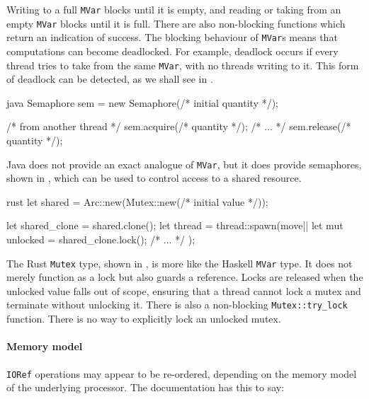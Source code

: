 Writing to a full \verb|MVar| blocks until it is empty, and reading or
taking from an empty \verb|MVar| blocks until it is full.  There are
also non-blocking functions which return an indication of success.
The blocking behaviour of \verb|MVar|s means that computations can
become deadlocked.  For example, deadlock occurs if every thread tries
to take from the same \verb|MVar|, with no threads writing to it.
This form of deadlock can be detected, as we shall see in
.

\begin{listing}
\centering
\begin{cminted}{java}
Semaphore sem = new Semaphore(/* initial quantity */);

/* from another thread */
sem.acquire(/* quantity */);
/* ... */
sem.release(/* quantity */);
\end{cminted}
\caption{Mutual exclusion in Java.}\label{lst:mute_java}
\end{listing}

Java does not provide an exact analogue of \verb|MVar|, but it does
provide semaphores\cite{ewd123}, shown in , which
can be used to control access to a shared resource.

\begin{listing}
\centering
\begin{cminted}{rust}
let shared = Arc::new(Mutex::new(/* initial value */));

let shared_clone = shared.clone();
let thread = thread::spawn(move|| {
    let mut unlocked = shared_clone.lock();
    /* ... */
});
\end{cminted}
\caption{Mutual exclusion in Rust.}\label{lst:mute_rust}
\end{listing}

The Rust \verb|Mutex| type, shown in , is more
like the Haskell \verb|MVar| type.  It does not merely function as a
lock but also guards a reference.  Locks are released when the
unlocked value falls out of scope, ensuring that a thread cannot lock
a mutex and terminate without unlocking it.  There is also a
non-blocking \verb|Mutex::try_lock| function.  There is no way to
explicitly lock an unlocked mutex.

\paragraph{Memory model}
\verb|IORef| operations may appear to be re-ordered, depending on the
memory model of the underlying processor.  The documentation has this
to say:

